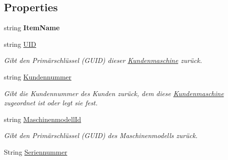 \subsection*{Properties}
\begin{DoxyCompactItemize}
\item 
string {\bfseries Item\+Name}\hypertarget{class_products_1_1_model_1_1_entities_1_1_kundenmaschine_ac4bf1645e0a31ade3ca19ce13f30a82a}{}\label{class_products_1_1_model_1_1_entities_1_1_kundenmaschine_ac4bf1645e0a31ade3ca19ce13f30a82a}

\item 
string \hyperlink{class_products_1_1_model_1_1_entities_1_1_kundenmaschine_adfb293d404d78c4fc59ba62ca87ddbc6}{U\+ID}
\begin{DoxyCompactList}\small\item\em Gibt den Primärschlüssel (G\+U\+ID) dieser \hyperlink{class_products_1_1_model_1_1_entities_1_1_kundenmaschine}{Kundenmaschine} zurück. \end{DoxyCompactList}\item 
string \hyperlink{class_products_1_1_model_1_1_entities_1_1_kundenmaschine_a46830408af92de452bec4435306d293e}{Kundennummer}
\begin{DoxyCompactList}\small\item\em Gibt die Kundennummer des Kunden zurück, dem diese \hyperlink{class_products_1_1_model_1_1_entities_1_1_kundenmaschine}{Kundenmaschine} zugeordnet ist oder legt sie fest. \end{DoxyCompactList}\item 
string \hyperlink{class_products_1_1_model_1_1_entities_1_1_kundenmaschine_ad063c385de54aa0d88a0687f4381451a}{Maschinenmodell\+Id}
\begin{DoxyCompactList}\small\item\em Gibt den Primärschlüssel (G\+U\+ID) des Maschinenmodells zurück. \end{DoxyCompactList}\item 
String \hyperlink{class_products_1_1_model_1_1_entities_1_1_kundenmaschine_a854408dc19b52b68a1c6b824761d5672}{Seriennummer}

\end{DoxyCompactItemize}
